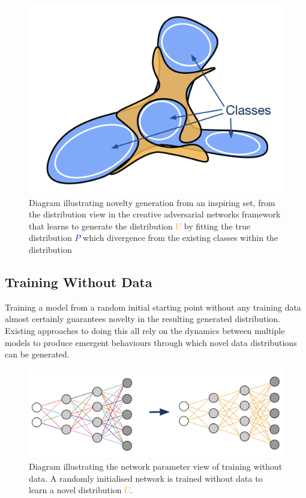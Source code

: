 \begin{figure}[!htbp]
    \centering
    \includegraphics[width=1\textwidth]{figures/c6_active_div/diagrams/creative_adversarial_networks.png}
    \caption[Novelty generation from an inspiring set]{Diagram illustrating novelty generation from an inspiring set, from the distribution view in the creative adversarial networks framework \citep{elgammal2017can} that learns to generate the distribution \textcolor{orange}{$U$} by fitting the true distribution \textcolor{blue}{$P$} which divergence from the existing classes within the distribution}
  \label{fig:c6:novelty-gen-inspiring-set}
  \end{figure}

\subsection{Training Without Data}
\label{survey:nodata}

Training a model from a random initial starting point without any training data almost certainly guarantees novelty in the resulting generated distribution. 
Existing approaches to doing this all rely on the dynamics between multiple models to produce emergent behaviours through which novel data distributions can be generated. 

\begin{figure}[!htbp]
    \centering
    \includegraphics[width=1\textwidth]{figures/c6_active_div/diagrams/training_without_data.png}
    \caption[Diagram illustrating the network parameter view of training without data.]{Diagram illustrating the network parameter view of training without data. A randomly initialised network is trained without data to learn a novel distribution \textcolor{orange}{$U$}.}
  \label{fig:c6:no-data}
  \end{figure}

